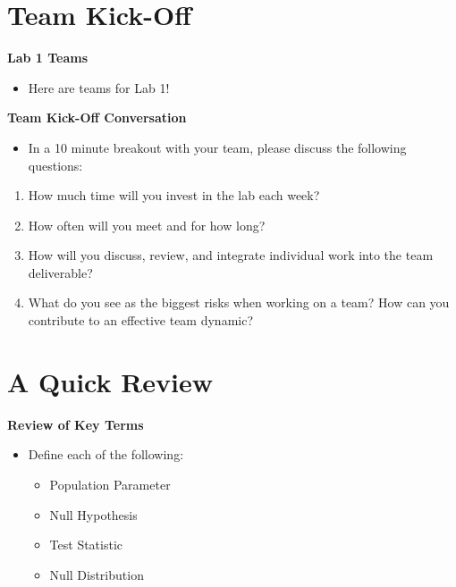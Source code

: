 \documentclass[
]{book}
\providecommand{\tightlist}{%
  \setlength{\itemsep}{0pt}\setlength{\parskip}{0pt}}
\theoremstyle{definition}
\theoremstyle{definition}
\theoremstyle{definition}
\theoremstyle{definition}
\theoremstyle{remark}
\begin{document}
\section{Team Kick-Off}\label{team-kick-off}

\textbf{Lab 1 Teams}

\begin{itemize}
\tightlist
\item
  Here are teams for Lab 1!
\end{itemize}

\textbf{Team Kick-Off Conversation}

\begin{itemize}
\tightlist
\item
  In a 10 minute breakout with your team, please discuss the following questions:
\end{itemize}

\begin{enumerate}
\def\labelenumi{\arabic{enumi}.}
\tightlist
\item
  How much time will you invest in the lab each week?
\item
  How often will you meet and for how long?
\item
  How will you discuss, review, and integrate individual work into the team deliverable?
\item
  What do you see as the biggest risks when working on a team? How can you contribute to an effective team dynamic?
\end{enumerate}

\section{A Quick Review}\label{a-quick-review}

\textbf{Review of Key Terms}

\begin{itemize}
\tightlist
\item
  Define each of the following:

  \begin{itemize}
  \tightlist
  \item
    Population Parameter
  \item
    Null Hypothesis
  \item
    Test Statistic
  \item
    Null Distribution
  \end{itemize}
\end{itemize}
\end{document}
